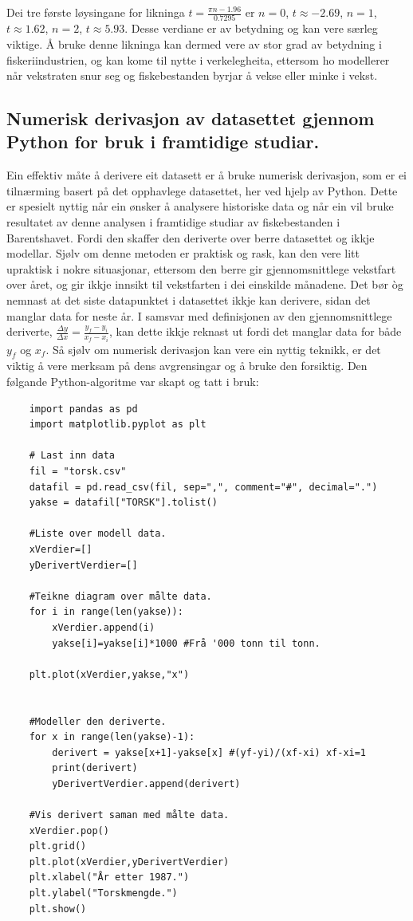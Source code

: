 \documentclass{report}
\begin{document}
Dei tre første løysingane for likninga $t=\frac{\pi n -1.96}{0.7295}$ er $n=0$, $t\approx -2.69$, $n=1$, $t\approx 1.62$, $n=2$, $t\approx 5.93$. Desse verdiane er av betydning og kan vere særleg viktige. Å bruke denne likninga kan dermed vere av stor grad av betydning i fiskeriindustrien, og kan kome til nytte i verkelegheita, ettersom ho modellerer når vekstraten snur seg og fiskebestanden byrjar å vekse eller minke i vekst.
\subsection{Numerisk derivasjon av datasettet gjennom Python for bruk i framtidige studiar.}
Ein effektiv måte å derivere eit datasett er å bruke numerisk derivasjon, som er ei tilnærming basert på det opphavlege datasettet, her ved hjelp av Python.
Dette er spesielt nyttig når ein ønsker å analysere historiske data og når ein vil bruke resultatet av denne analysen i framtidige studiar av fiskebestanden i Barentshavet.
Fordi den skaffer den deriverte over berre datasettet og ikkje modellar.
Sjølv om denne metoden er praktisk og rask, kan den vere litt upraktisk i nokre situasjonar, ettersom den berre gir gjennomsnittlege vekstfart over året, og gir ikkje innsikt til vekstfarten i dei einskilde månadene.
Det bør òg nemnast at det siste datapunktet i datasettet ikkje kan derivere, sidan det manglar data for neste år. I samsvar med definisjonen av den gjennomsnittlege deriverte, $\frac{\Delta y}{\Delta x}=\frac{y_f-y_i}{x_f-x_i}$, kan dette ikkje reknast ut fordi det manglar data for både $y_f$ og $x_f$. Så sjølv om numerisk derivasjon kan vere ein nyttig teknikk, er det viktig å vere merksam på dens avgrensingar og å bruke den forsiktig.
\newline\newline
Den følgande Python-algoritme var skapt og tatt i bruk:
\begin{verbatim}
    import pandas as pd
    import matplotlib.pyplot as plt

    # Last inn data
    fil = "torsk.csv"
    datafil = pd.read_csv(fil, sep=",", comment="#", decimal=".")
    yakse = datafil["TORSK"].tolist()

    #Liste over modell data.
    xVerdier=[]
    yDerivertVerdier=[]

    #Teikne diagram over målte data.
    for i in range(len(yakse)):
        xVerdier.append(i)
        yakse[i]=yakse[i]*1000 #Frå '000 tonn til tonn.

    plt.plot(xVerdier,yakse,"x")


    #Modeller den deriverte.
    for x in range(len(yakse)-1):
        derivert = yakse[x+1]-yakse[x] #(yf-yi)/(xf-xi) xf-xi=1
        print(derivert)
        yDerivertVerdier.append(derivert)

    #Vis derivert saman med målte data.
    xVerdier.pop()
    plt.grid()
    plt.plot(xVerdier,yDerivertVerdier)
    plt.xlabel("År etter 1987.")
    plt.ylabel("Torskmengde.")
    plt.show()
\end{verbatim}
\end{document}
